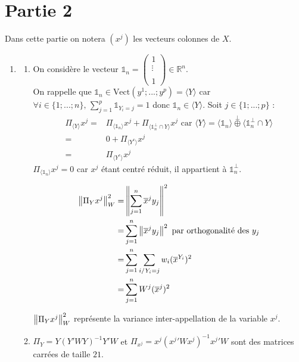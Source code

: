 \documentclass{article}
\begin{document}
\section{Partie 2}

Dans cette partie on notera $(x^j)$ les vecteurs colonnes de $X$. 

\begin{enumerate}
\item 
	\begin{enumerate}
	\item On considère le vecteur $\mathds{1}_n=\begin{pmatrix}
	1 \\ 
	\vdots \\ 
	 \\ 
	1
	\end{pmatrix} \in\mathbb{R}^{n}$.\\
	 On rappelle que $\mathds{1}_n\in \text{Vect}\left(y^1;...;y^p\right)=\langle Y \rangle$ car $\forall i\in\{1;...;n\},\, \sum_{j=1}^p \mathds{1}_{Y_i=j}=1$ donc $\mathds{1}_n\in \langle Y \rangle$.
Soit $j\in\{1;...;p\}$ :
	\begin{align*}
	\Pi_{\langle Y \rangle} x^j =& \Pi_{\langle\mathds{1}_n\rangle}x^j +\Pi_{\langle \mathds{1}_n^{\perp} \cap Y \rangle} x^j  \text{ car } \langle Y \rangle = \langle \mathds{1}_n \rangle \overset{\perp}{\oplus}\langle \mathds{1}_n^{\perp} \cap Y \rangle \\
	  =& 0 + \Pi_{\langle Y^c \rangle} x^j \\
	  =& \Pi_{\langle Y^c \rangle} x^j
	\end{align*}
 $\Pi_{\langle\mathds{1}_n\rangle}x^j=0$ car $x^j$ étant centré réduit, il appartient à $\mathds{1}_n^{\perp}$.

\begin{align*}
\left\| \Pi_Y x^j\right\|^2_{W} =& \left\| \sum_{j=1}^n \overline{x}^j y_j\right\|^2 \\
=& \sum_{j=1}^n \left\| \overline{x}^j y_j\right\|^2 \text{ par orthogonalité des $y_j$} \\
					   =& \sum_{j=1}^n \sum_{i/Y_i=j} w_i (\overline{x}^{Y_i})^2 \\ 
					   =& \sum_{j=1}^n W^j (\overline{x}^j)^2 
\end{align*}
 
 
 
	
	$\left\| \Pi_Yx^j\right\|^2_{W}$ représente la variance inter-appellation de la variable $x^j$.
	
	\item $\Pi_Y=Y\left(Y'WY\right)^{-1}Y'W$  et $\Pi_{x^j}=x^{j}\left({x^{j}}'Wx^{j}\right)^{-1}{x^{j}}'W$ sont des matrices carrées de taille $21$.\\


\end{enumerate}
\end{enumerate}
\end{document}
